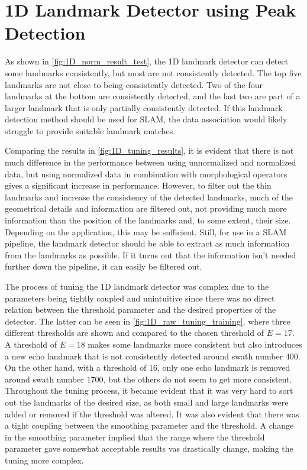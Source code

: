 \section{1D Landmark Detector using Peak Detection}

As shown in \cref{fig:1D_norm_result_test}, the 1D landmark detector can detect some landmarks consistently, but most are not consistently detected. The top five landmarks are not close to being consistently detected. Two of the four landmarks at the bottom are consistently detected, and the last two are part of a larger landmark that is only partially consistently detected. If this landmark detection method should be used for SLAM, the data association would likely struggle to provide suitable landmark matches. 

Comparing the results in \cref{fig:1D_tuning_results}, it is evident that there is not much difference in the performance between using unnormalized and normalized data, but using normalized data in combination with morphological operators gives a significant increase in performance. However, to filter out the thin landmarks and increase the consistency of the detected landmarks, much of the geometrical details and information are filtered out, not providing much more information than the position of the landmarks and, to some extent, their size. Depending on the application, this may be sufficient. Still, for use in a SLAM pipeline, the landmark detector should be able to extract as much information from the landmarks as possible. If it turns out that the information isn't needed further down the pipeline, it can easily be filtered out. 

The process of tuning the 1D landmark detector was complex due to the parameters being tightly coupled and unintuitive since there was no direct relation between the threshold parameter and the desired properties of the detector. The latter can be seen in \cref{fig:1D_raw_tuning_training}, where three different thresholds are shown and compared to the chosen threshold of $E = 17$. A threshold of $E = 18$ makes some landmarks more consistent but also introduces a new echo landmark that is not consistently detected around swath number $400$. On the other hand, with a threshold of $16$, only one echo landmark is removed around swath number $1700$, but the others do not seem to get more consistent. Throughout the tuning process, it became evident that it was very hard to sort out the landmarks of the desired size, as both small and large landmarks were added or removed if the threshold was altered. It was also evident that there was a tight coupling between the smoothing parameter and the threshold. A change in the smoothing parameter implied that the range where the threshold parameter gave somewhat acceptable results vas drastically change, making the tuning more complex. 

